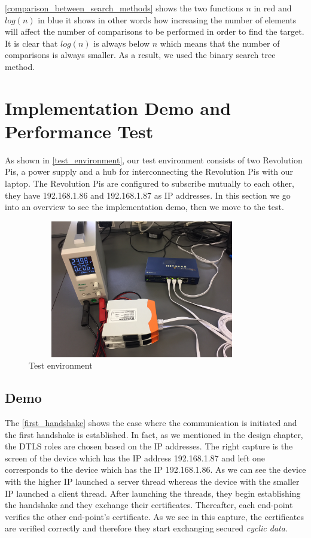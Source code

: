 \autoref{comparison_between_search_methods} shows the two functions $n$ in red and $log(n)$ in blue it shows in
other words how increasing the number of elements will affect the number of comparisons to be performed in order
to find the target. It is clear that $log(n)$ is always below $n$ which means that the number
of comparisons is always smaller. As a result, we used the binary search tree method.

\section{Implementation Demo and Performance Test}

As shown in \autoref{test_environment}, our test environment consists of two Revolution Pis, a power supply and
a hub for interconnecting the Revolution Pis with our laptop.
The Revolution Pis are configured to subscribe mutually to each other, they have 192.168.1.86
and 192.168.1.87 as IP addresses.
In this section we go into an overview to see the implementation demo, then we move to the test.

\begin{figure}[H]
\centering
\includegraphics[width=10cm,height=6cm,frame]{figures/realization/test_environment.JPG}
\caption{Test environment}\label{test_environment}
\end{figure}

\subsection{Demo}

The \autoref{first_handshake} shows the case where the communication is initiated and the first handshake is established.
In fact, as we mentioned in the design chapter, the DTLS roles are chosen based on the IP addresses.
The right capture is the screen of the device which has the IP address 192.168.1.87 and left one
corresponds to the device which has the IP 192.168.1.86. As we can see the device with the higher IP launched
a server thread whereas the device with the smaller IP launched a client thread. After launching the threads,
they begin establishing the handshake and they exchange their certificates. Thereafter, each end-point
verifies the other end-point's certificate. As we see in this capture, the certificates are verified correctly and
therefore they start exchanging secured \textit{cyclic data}.

